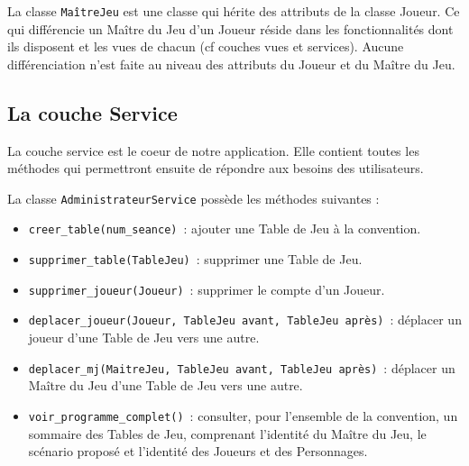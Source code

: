 \documentclass[11pt]{article}
\begin{document}
\bigbreak

La classe \texttt{MaîtreJeu} est une classe qui hérite des attributs de la classe Joueur. Ce qui différencie un Maître du Jeu d'un Joueur réside dans les fonctionnalités dont ils disposent et les vues de chacun (cf couches vues et services). Aucune différenciation n'est faite au niveau des attributs du Joueur et du Maître du Jeu.







\subsection{La couche Service}

La couche service est le coeur de notre application. Elle contient toutes les méthodes qui permettront ensuite de répondre aux besoins des utilisateurs.




\bigbreak


La classe \texttt{AdministrateurService} possède les méthodes suivantes :
\begin{itemize}[label=, font=\small]
    \item \texttt{creer\_table(num\_seance)}~: ajouter une Table de Jeu à la convention.
    \item \texttt{supprimer\_table(TableJeu)}~: supprimer une Table de Jeu.
    \item \texttt{supprimer\_joueur(Joueur)}~: supprimer le compte d'un Joueur.
    \item \texttt{deplacer\_joueur(Joueur, TableJeu avant, TableJeu après)}~: déplacer un joueur d'une Table de Jeu vers une autre.
    \item \texttt{deplacer\_mj(MaitreJeu, TableJeu avant, TableJeu après)}~: déplacer un Maître du Jeu d'une Table de Jeu vers une autre.
    \item \texttt{voir\_programme\_complet()}~: consulter, pour l'ensemble de la convention, un sommaire des Tables de Jeu, comprenant l'identité du Maître du Jeu, le scénario proposé et l'identité des Joueurs et des Personnages.
\end{itemize}

\bigbreak
\end{document}
